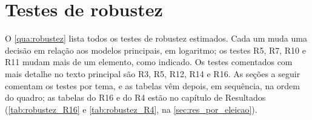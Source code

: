 
\chapter{Testes de robustez}\label{ap:robustez}

O \autoref{qua:robustez} lista todos os testes de robustez estimados. Cada um muda uma decisão em relação aos modelos principais, em logaritmo; os testes R5, R7, R10 e R11 mudam mais de um elemento, como indicado. Os testes comentados com mais detalhe no texto principal são R3, R5, R12, R14 e R16. As seções a seguir comentam os testes por tema, e as tabelas vêm depois, em sequência, na ordem do quadro; as tabelas do R16 e do R4 estão no capítulo de Resultados (\autoref{tab:robustez_R16} e \autoref{tab:robustez_R4}, na \autoref{sec:res_por_eleicao}).

